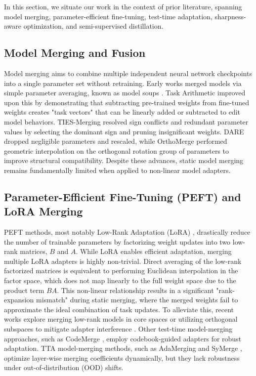\documentclass{article}
\begin{document}
In this section, we situate our work in the context of prior literature, spanning model merging, parameter-efficient fine-tuning, test-time adaptation, sharpness-aware optimization, and semi-supervised distillation.

\subsection{Model Merging and Fusion}
Model merging aims to combine multiple independent neural network checkpoints into a single parameter set without retraining. Early works merged models via simple parameter averaging, known as model soups \cite{wortsman2022soups}. Task Arithmetic \cite{ilharco2022taskarithmetic} improved upon this by demonstrating that subtracting pre-trained weights from fine-tuned weights creates "task vectors" that can be linearly added or subtracted to edit model behaviors. TIES-Merging \cite{yadav2023ties} resolved sign conflicts and redundant parameter values by selecting the dominant sign and pruning insignificant weights. DARE \cite{niwa2024dare} dropped negligible parameters and rescaled, while OrthoMerge \cite{yang2026orthomerge} performed geometric interpolation on the orthogonal rotation group of parameters to improve structural compatibility. Despite these advances, static model merging remains fundamentally limited when applied to non-linear model adapters.

\subsection{Parameter-Efficient Fine-Tuning (PEFT) and LoRA Merging}
PEFT methods, most notably Low-Rank Adaptation (LoRA) \cite{hu2021lora}, drastically reduce the number of trainable parameters by factorizing weight updates into two low-rank matrices, $B$ and $A$. While LoRA enables efficient adaptation, merging multiple LoRA adapters is highly non-trivial. Direct averaging of the low-rank factorized matrices is equivalent to performing Euclidean interpolation in the factor space, which does not map linearly to the full weight space due to the product term $BA$. This non-linear relationship results in a significant "rank-expansion mismatch" during static merging, where the merged weights fail to approximate the ideal combination of task updates. To alleviate this, recent works explore merging low-rank models in core spaces \cite{panariello2025accurate} or utilizing orthogonal subspaces to mitigate adapter interference \cite{zhang2025unraveling}. Other test-time model-merging approaches, such as CodeMerge \cite{yang2025codemerge}, employ codebook-guided adapters for robust adaptation. TTA model-merging methods, such as AdaMerging \cite{yang2024adamerging} and SyMerge \cite{jung2025symerge}, optimize layer-wise merging coefficients dynamically, but they lack robustness under out-of-distribution (OOD) shifts.
\end{document}
